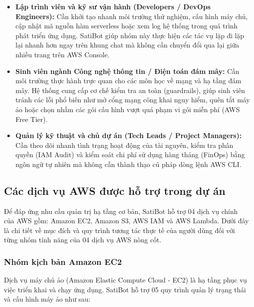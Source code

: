 \documentclass[a4paper,12pt]{article}
\begin{document}
\begin{itemize}
  \item \textbf{Lập trình viên và kỹ sư vận hành (Developers / DevOps Engineers):} Cần khởi tạo nhanh môi trường thử nghiệm, cấu hình máy chủ, cập nhật mã nguồn hàm serverless hoặc xem log hệ thống trong quá trình phát triển ứng dụng. SatiBot giúp nhóm này thực hiện các tác vụ lặp đi lặp lại nhanh hơn ngay trên khung chat mà không cần chuyển đổi qua lại giữa nhiều trang trên AWS Console.
  \item \textbf{Sinh viên ngành Công nghệ thông tin / Điện toán đám mây:} Cần môi trường thực hành trực quan cho các môn học về mạng và hạ tầng đám mây. Hệ thống cung cấp cơ chế kiểm tra an toàn (guardrails), giúp sinh viên tránh các lỗi phổ biến như mở cổng mạng công khai nguy hiểm, quên tắt máy ảo hoặc chọn nhầm các gói cấu hình vượt quá phạm vi gói miễn phí (AWS Free Tier).
  \item \textbf{Quản lý kỹ thuật và chủ dự án (Tech Leads / Project Managers):} Cần theo dõi nhanh tình trạng hoạt động của tài nguyên, kiểm tra phân quyền (IAM Audit) và kiểm soát chi phí sử dụng hàng tháng (FinOps) bằng ngôn ngữ tự nhiên mà không cần thành thạo cú pháp dòng lệnh AWS CLI.
\end{itemize}

\subsection{Các dịch vụ AWS được hỗ trợ trong dự án}

\begingroup
{}
\setlength{\parskip}{2pt}

Để đáp ứng nhu cầu quản trị hạ tầng cơ bản, SatiBot hỗ trợ 04 dịch vụ chính của AWS gồm: Amazon EC2, Amazon S3, AWS IAM và AWS Lambda. Dưới đây là chi tiết về mục đích và quy trình tương tác thực tế của người dùng đối với từng nhóm tính năng của 04 dịch vụ AWS nòng cốt.

\subsubsection{Nhóm kịch bản Amazon EC2}

Dịch vụ máy chủ ảo (Amazon Elastic Compute Cloud - EC2) là hạ tầng phục vụ việc triển khai và chạy ứng dụng. SatiBot hỗ trợ 05 quy trình quản lý trạng thái và cấu hình máy ảo như sau:
\end{document}
